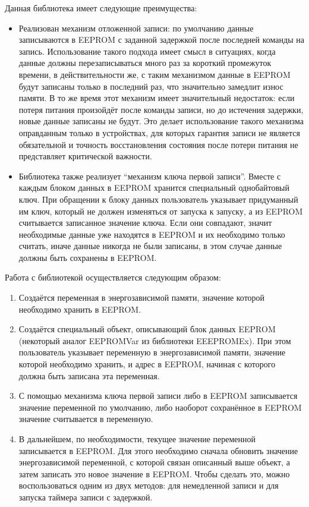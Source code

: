 Данная библиотека имеет следующие преимущества:
\begin{itemize}
	\item Реализован механизм отложенной записи: по умолчанию данные записываются в EEPROM с заданной задержкой после последней команды на запись. Использование такого подхода имеет смысл в ситуациях, когда данные должны перезаписываться много раз за короткий промежуток времени, в действительности же, с таким механизмом данные в EEPROM будут записаны только в последний раз, что значительно замедлит износ памяти. В то же время этот механизм имеет значительный недостаток: если потеря питания произойдёт после команды записи, но до истечения задержки, новые данные записаны не будут. Это делает использование такого механизма оправданным только в устройствах, для которых гарантия записи не является обязательной и точность восстановления состояния после потери питания не представляет критической важности.
	\item Библиотека также реализует "`механизм ключа первой записи"'. Вместе с каждым блоком данных в EEPROM хранится специальный однобайтовый ключ. При обращении к блоку данных пользователь указывает придуманный им ключ, который не должен изменяться от запуска к запуску, а из EEPROM считывается записанное значение ключа. Если они совпадают, значит необходимые данные уже находятся в EEPROM и их необходимо только считать, иначе данные никогда не были записаны, в этом случае данные должны быть сохранены в EEPROM.
\end{itemize}

Работа с библиотекой осуществляется следующим образом:
\begin{enumerate}
	\item Создаётся переменная в энергозависимой памяти, значение которой необходимо хранить в EEPROM.
	\item Создаётся специальный объект, описывающий блок данных EEPROM (некоторый аналог EEPROMVar из библиотеки EEEPROMEx).
	При этом пользователь указывает переменную в энергозависимой памяти, значение которой  необходимо хранить, и адрес в EEPROM, начиная с которого должна быть записана эта переменная.
	\item С помощью механизма ключа первой записи либо в EEPROM записывается значение переменной по умолчанию, либо наоборот сохранённое в EEPROM значение считывается в переменную.
	\item В дальнейшем, по необходимости, текущее значение переменной записывается в EEPROM.
	Для этого необходимо сначала обновить значение энергозависимой переменной, с которой связан описанный выше объект, а затем записать это новое значение в EEPROM.
	Чтобы сделать это, можно воспользоваться одним из двух методов: для немедленной записи и для запуска таймера записи с задержкой.
\end{enumerate}

